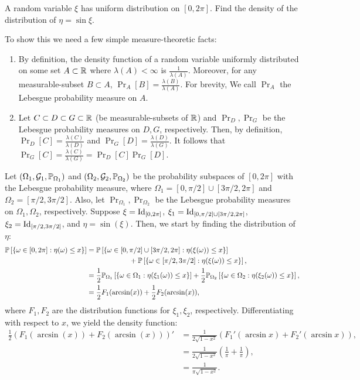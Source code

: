 \begin{problem}{11}
    A random variable $\xi$ has uniform distribution on $[0,2\pi]$. Find the density of the distribution of $\eta = \sin\xi$.
\end{problem}
\begin{solution}
    To show this we need a few simple measure-theoretic facts:
    \begin{enumerate}
        \item By definition, the density function of a random variable uniformly
        distributed on some set $A\subset \mathbb{R}$ where $\lambda(A) < \infty$ is
        $\frac{1}{\lambda(A)}$.  Moreover, for any measurable-subset $B\subset
        A$, $\Pr_A[B] = \frac{\lambda(B)}{\lambda(A)}$. For brevity, We call
        $\Pr_A$ the Lebesgue probability measure on $A$. 
        \item Let $C\subset D \subset G \subset \mathbb{R}$ (be measurable-subsets of
        $\mathbb{R}$) and $\Pr_D, \Pr_G$ be the Lebesgue probability measures on $D,G$,
        respectively. Then, by definition, $\Pr_D[C] =
        \frac{\lambda(C)}{\lambda(D)}$ and $\Pr_G[D] =
        \frac{\lambda(D)}{\lambda(G)}$. It follows that $\Pr_G[C] =
        \frac{\lambda(C)}{\lambda(G)} = \Pr_D[C]\Pr_G[D]$.
    \end{enumerate}
    Let $(\Omega_1, \mathcal{G}_1, \mathbb{P}_{\Omega_1})$ and $(\Omega_2, \mathcal{G}_2,
    \mathbb{P}_{\Omega_2})$ be the probability subspaces of $[0,2\pi]$ with the
    Lebesgue probability measure, where $\Omega_1 =[0,\pi/2] \cup [3\pi/2,2\pi]$
    and $\Omega_2 = [\pi/2,3\pi/2]$. Also, let $\Pr_{\Omega_1}, \Pr_{\Omega_2}$
    be the Lebesgue probability measures on $\Omega_1,\Omega_2$, respectively.
    Suppose $\xi = \operatorname{Id}_{[0,2\pi]}$, $\xi_1 = \operatorname{Id}_{[0,\pi/2] \cup
    [3\pi/2,2\pi]}$, $\xi_2 = \operatorname{Id}_{[\pi/2,3\pi/2]}$, and $\eta = \sin(\xi)$.
    Then, we start by finding the distribution of $\eta$:
    \begin{align*}
        \mathbb{P}\left[\left\{ \omega \in [0,2\pi]: \eta(\omega) \leq x \right\}\right] &= \mathbb{P}\left[\left\{ \omega \in [0,\pi/2]\cup [3\pi/2,2\pi]: \eta(\xi(\omega)) \leq x \right\}\right] \\
        &\qquad\qquad\qquad + \mathbb{P}\left[\left\{ \omega \in [\pi/2,3\pi/2]: \eta(\xi(\omega)) \leq x \right\}\right], \\
        &= \frac{1}{2}\mathbb{P}_{\Omega_1}\left[\left\{ \omega \in \Omega_1: \eta(\xi_1(\omega)) \leq x \right\}\right] + \frac{1}{2}\mathbb{P}_{\Omega_2}\left[\left\{ \omega \in \Omega_2: \eta(\xi_2(\omega)) \leq x \right\}\right], \\
        &= \frac{1}{2}F_1(\arcsin(x)) + \frac{1}{2}F_2(\arcsin(x)),
    \end{align*}
    where $F_1,F_2$ are the distribution functions for $\xi_1,\xi_2$, respectively. Differentiating with respect to $x$, we yield the density function:
    \begin{align*}
        \frac{1}{2}\left(F_1(\arcsin(x)) + F_2(\arcsin(x))\right)' &= \frac{1}{2\sqrt{1-x^2}}\left(F_1'(\arcsin x) + F_2'(\arcsin x)\right), \\
        &= \frac{1}{2\sqrt{1-x^2}}\left(\frac{1}{\pi} + \frac{1}{\pi}\right),\\
        &= \frac{1}{\pi\sqrt{1-x^2}}.
    \end{align*}
\end{solution}
